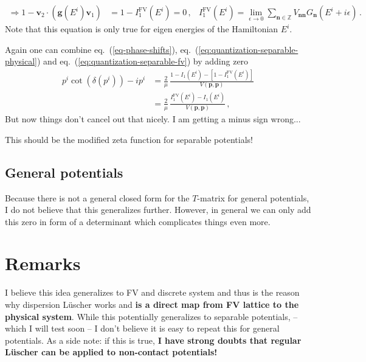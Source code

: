 \documentclass[
    aps,
    prl,
    showkeys,
    nofootinbib,
    floatfix
]{revtex4}
\renewcommand{\vec}[1]{\boldsymbol{#1}}
\begin{document}
\begin{align}\label{eq:quantization-separable-fv}
	\Rightarrow
	1 - \vec v_2 \cdot ( \vec g(E^i) \vec v_1) &= 1 - I_1^{\mathrm{FV}}(E^i) = 0 \, , &
	I_1^{\mathrm{FV}}(E^i) = \lim\limits_{\epsilon \to 0}\sum\limits_{\vec n \in \mathbb Z} V_{\vec n \vec n}G_{\vec n}(E^i + i \epsilon) \, .
\end{align}
Note that this equation is only true for eigen energies of the Hamiltonian $E^i$.

Again one can combine eq.~(\ref{eq-phase-shifts}), eq.~(\ref{eq:quantization-separable-physical}) and eq.~(\ref{eq:quantization-separable-fv}) by adding zero
\begin{align}
	p^i \cot(\delta(p^i)) -i p^i 
	&= 
	\frac{2}{\mu} \, \frac{1 - I_1(E^i) - \left[ 1 - I_1^{\mathrm{FV}}(E^i) \right]}{V(\vec p, \vec p)}
	\\ &=
	\frac{2}{\mu} \, \frac{I_1^{\mathrm{FV}}(E^i) - I_1(E^i)}{V(\vec p, \vec p)}
	\, ,
\end{align}
But now things don't cancel out that nicely.
{\color{red} I am getting a minus sign wrong...}

This should be the modified zeta function for separable potentials!

\subsection{General potentials}
Because there is not a general closed form for the $T$-matrix for general potentials, I do not believe that this generalizes further.
However, in general we can only add this zero in form of a determinant which complicates things even more.

\section{Remarks}
I believe this idea generalizes to FV and discrete system and thus is the reason why dispersion Lüscher works and \textbf{is a direct map from FV lattice to the physical system}.
While this potentially generalizes to separable potentials, -- which I will test soon -- I don't believe it is easy to repeat this for general potentials.
As a side note: if this is true, \textbf{I have strong doubts that regular Lüscher can be applied to non-contact potentials!}
\end{document}
